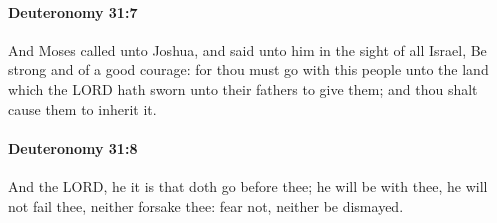 		\paragraph{Deuteronomy 31:7} %
			\label{DEUTERONOMY-31-7}

			And Moses called unto Joshua, and said unto him in the sight of all Israel, Be strong and of a good courage: for thou must go with this people unto the land which the LORD hath sworn unto their fathers to give them; and thou shalt cause them to inherit it.


		\paragraph{Deuteronomy 31:8} %
			\label{DEUTERONOMY-31-8}

			And the LORD, he it is that doth go before thee; he will be with thee, he will not fail thee, neither forsake thee: fear not, neither be dismayed.


